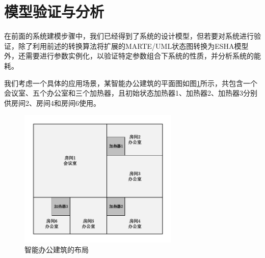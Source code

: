 \section{模型验证与分析}
	在前面的系统建模步骤中，我们已经得到了系统的设计模型，但若要对系统进行验证，除了利用前述的转换算法将扩展的MARTE/UML状态图转换为ESHA模型外，还需要进行参数实例化，以验证特定参数组合下系统的性质，并分析系统的能耗。
	
	我们考虑一个具体的应用场景，某智能办公建筑的平面图如图\ref{building}所示，共包含一个会议室、五个办公室和三个加热器，且初始状态加热器1、加热器2、加热器3分别供房间2、房间4和房间6使用。
	
	\begin{figure}[!t]
	\centering
	\includegraphics[width=3in]{building.pdf}
	\caption{智能办公建筑的布局}
	\label{building}
	\end{figure}
	
